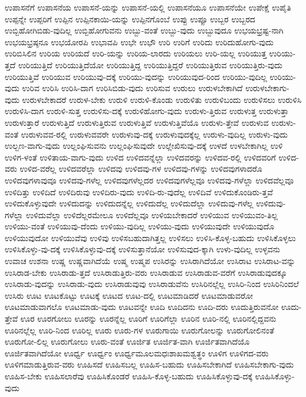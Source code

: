 {ಉಪಾಸನೆಗೆ
ಉಪಾಸನೆಯ
ಉಪಾಸನೆ-ಯನ್ನು
ಉಪಾಸನೆ-ಯಲ್ಲಿ
ಉಪಾಸನೆಯೂ
ಉಪಾಸನೆಯೇ
ಉಪೇಕ್ಷೆ
ಉಪೈತಿ
ಉಪ್ಪನ್ನೇ
ಉಪ್ಪರಿಗೆ
ಉಪ್ಪಿನ
ಉಪ್ಪಿನಕಾಯಿ-ಯನ್ನು
ಉಪ್ಪಿನಗೊಂಬೆ
ಉಪ್ಪು
ಉಪ್ಪೂ
ಉಬ್ಬರ
ಉಬ್ಬರದ
ಉಬ್ಬಿಹೋಗಿಬಿಡು-ವುದಿಲ್ಲ
ಉಬ್ಬಿಹೋಗುವನು
ಉಬ್ಬು-ವಂತೆ
ಉಬ್ಬು-ವುದು
ಉಬ್ಬುವುದೂ
ಉಭಯಭ್ರಷ್ಟ-ನಾಗಿ
ಉಭಯಭ್ರಷ್ಠನೂ
ಉಭಯೋರಪಿ
ಉಭಾವಪಿ
ಉಭೇ
ಉಭೌ
ಉರಿ
ಉರಿಗೆ
ಉರಿದು
ಉರಿದುಹೋಗು-ವುದು
ಉರಿಬಿಸಿಲಿನ
ಉರಿಯ
ಉರಿಯದೆ
ಉರಿ-ಯನ್ನು
ಉರಿಯ-ಲಾರದು
ಉರಿಯಲು
ಉರಿ-ಯಲ್ಲ
ಉರಿಯುತ್ತ
ಉರಿಯು-ತ್ತದೆ
ಉರಿಯುತ್ತಿದೆ
ಉರಿಯುತ್ತಿದೆಯೋ
ಉರಿಯುತ್ತಿದ್ದ
ಉರಿಯುತ್ತಿದ್ದರೆ
ಉರಿಯುತ್ತಿರುವ
ಉರಿಯುತ್ತಿರು-ವುದು
ಉರಿಯುತ್ತಿವೆ
ಉರಿಯುವ
ಉರಿಯುವು-ದಕ್ಕೆ
ಉರಿಯು-ವುದನ್ನು
ಉರಿಯುವುದ-ರಿಂದ
ಉರಿಯು-ವುದಿಲ್ಲ
ಉರಿಯು-ವುದು
ಉರಿವ
ಉರಿಸಿ
ಉರಿಸಿ-ದಾಗ
ಉರಿಸಿಬಿಡು-ವುದು
ಉರಿಸುವ
ಉರುಲು
ಉರುಳಬೇಕಾಗಿದೆ
ಉರುಳಬೇಕಾಗು-ವುದು
ಉರುಳಬೇಕಾದರೆ
ಉರುಳ-ಬೇಕು
ಉರುಳಿ
ಉರುಳಿ-ಕೊಂಡು
ಉರುಳಿತು
ಉರುಳಿಬಂದು
ಉರುಳಿಸಲು
ಉರುಳಿಸಿ
ಉರುಳಿಸಿ-ದಾಗ
ಉರುಳಿ-ಸುತ್ತ
ಉರುಳಿಸು-ದಕ್ಕೆ
ಉರುಳಿಹೋಗು-ವುದು
ಉರುಳು-ತ್ತಿರುವ
ಉರುಳುತ್ತ
ಉರುಳುತ್ತಾ
ಉರುಳುತ್ತಾರೆ
ಉರುಳುತ್ತಿದೆ
ಉರುಳುತ್ತಿರುವ
ಉರುಳುತ್ತಿವೆ
ಉರುಳುತ್ತಿವೆಯೊ
ಉರುಳು-ತ್ತೇವೆ
ಉರುಳುವ
ಉರುಳು-ವಂತೆ
ಉರುಳುವವ-ರಲ್ಲಿ
ಉರುಳುವವರೇ
ಉರುಳುವು-ದಕ್ಕೆ
ಉರುಳುವುದಕ್ಕೆಲ್ಲ
ಉರುಳು-ವುದಿಲ್ಲ
ಉರುಳು-ವುದು
ಉಲ್ಬಣ-ವಾಗು-ವುದು
ಉಲ್ಲಂಘಿಸುವನು
ಉಲ್ಲಂಘಿಸುವುದೇ
ಉಲ್ಲೇಖಿಸುವು-ದಕ್ಕೆ
ಉಳದೆ
ಉಳಬೇಕಾಗಿಲ್ಲ
ಉಳಿ
ಉಳಿಗ-ಳಂತೆ
ಉಳಿತಾಯ-ವಾಗು-ವುದು
ಉಳಿದ
ಉಳಿದವನ್ನೆಲ್ಲಾ
ಉಳಿದವರನ್ನು
ಉಳಿದವ-ರಲ್ಲಿ
ಉಳಿದವರಿಗೆ
ಉಳಿದ-ವರು
ಉಳಿದ-ವರೆಲ್ಲ
ಉಳಿದವರೆಲ್ಲಾ
ಉಳಿದವು
ಉಳಿದವು-ಗಳ
ಉಳಿದವು-ಗಳನ್ನು
ಉಳಿದವುಗಳಾದರೊ
ಉಳಿದವುಗಳಾವುವೂ
ಉಳಿದವು-ಗಳೆಲ್ಲ
ಉಳಿದವುಗಳೆಲ್ಲದರ
ಉಳಿದವುಗಳೆಲ್ಲವೂ
ಉಳಿದವು-ಗಳೆಲ್ಲಾ
ಉಳಿದವೆಲ್ಲವೂ
ಉಳಿದಿತ್ತು
ಉಳಿದಿದೆ
ಉಳಿದಿರುವು
ಉಳಿದಿರು-ವುದು
ಉಳಿದಿ-ರು-ವುದೆಲ್ಲ
ಉಳಿದಿವೆ
ಉಳಿದುಕೊಂಡಿರು-ತ್ತವೆ
ಉಳಿದುಕೊಳ್ಳುವುದೇ
ಉಳಿದುದನ್ನು
ಉಳಿದುದನ್ನೆಲ್ಲ
ಉಳಿದುದೆಲ್ಲ
ಉಳಿದುದೆಲ್ಲಾ
ಉಳಿದುವು-ಗಳೆಲ್ಲ
ಉಳಿದುವು-ಗಳೆಲ್ಲಾ
ಉಳಿದುವೆಲ್ಲಾ
ಉಳಿದೆಲ್ಲರಮೇಲೂ
ಉಳಿದೆಲ್ಲವೂ
ಉಳಿಯಬೇಕಾದರೆ
ಉಳಿಯುವ
ಉಳಿಯುವಂ-ತಿಲ್ಲ
ಉಳಿಯು-ವಂತೆ
ಉಳಿಯುವು-ದೆಂದು
ಉಳಿಯು-ವುದಿಲ್ಲ
ಉಳಿಯು-ವುದು
ಉಳಿಯುವುದೇ
ಉಳಿಯುವುದೊ
ಉಳಿಯುವುದೋ
ಉಳಿಯುವೆವು
ಉಳಿವು
ಉಳಿಸಬಹುದಾಗಿತ್ತಲ್ಲ
ಉಳಿಸಲು
ಉಳಿಸಿ-ಕೊಳ್ಳ-ಬಹುದು
ಉಳಿಸಿಕೊಳ್ಳಲು
ಉಳಿಸಿಕೊಳ್ಳು-ವು-ದಕ್ಕೆ
ಉಳಿಸಿಕೊಳ್ಳುವು-ದಕ್ಕೆ
ಉಳಿಸುತ್ತಾನೆಯೋ
ಉಳಿಸುವುದ-ಕ್ಕಾಗಿ
ಉಳು-ವುದಿಲ್ಲ
ಉಳ್ಳವನು
ಉವಾಚ
ಉಶನಾ
ಉಷ್ಣ
ಉಷ್ಣವಾಗಿದೆಯೆ
ಉಷ್ಮ
ಉಷ್ಮಪ
ಉಸಿರನ್ನು
ಉಸಿರಾಗಿದೆಯೋ
ಉಸಿರಾಟ
ಉಸಿರಾಟ-ವನ್ನು
ಉಸಿರಾಡ-ಬೇಕು
ಉಸಿರಾಡು-ತ್ತದೆ
ಉಸಿರಾಡುತ್ತಿರು-ವರು
ಉಸಿರಾಡುವ
ಉಸಿರಾಡುವ-ವರೆಗೆ
ಉಸಿರಾಡುವುದಕ್ಕೂ
ಉಸಿರಾಡು-ವುದನ್ನು
ಉಸಿರಾಡು-ವುದು
ಉಸಿರಾಡುವುವು
ಉಸಿರಾಡುವೆನು
ಉಸಿರಿನಲ್ಲೆಲ್ಲ
ಉಸಿರಿ-ನಿಂದ
ಉಸಿರಿನಿಂದಲೆ
ಉಸಿರು
ಊಟ
ಊಟಕೊಟ್ಟು
ಊಟಕ್ಕೆ
ಊಟದ
ಊಟ-ದಲ್ಲಿ
ಊಟಮಾಡಿದರೆ
ಊಟಮಾಡುವರೋ
ಊಟಮಾಡುವಾಗಲೊ
ಊಟಮಾಡು-ವುದು
ಊಟವನ್ನೇ
ಊದಿ
ಊದಿದನು
ಊದಿ-ದರು
ಊದುತ್ತಿರುವನೋ
ಊದು-ತ್ತೇವೆ
ಊರ
ಊರಗೋಲು
ಊರನ್ನು
ಊರನ್ನೆಲ್ಲ
ಊರಿಗೆ
ಊರಿಗೆಲ್ಲಾ
ಊರಿನ
ಊರಿ-ನಲ್ಲಿ
ಊರಿನಲ್ಲಿದ್ದವನು
ಊರಿನಲ್ಲೆಲ್ಲ
ಊರಿ-ನಿಂದ
ಊರಿಲ್ಲ
ಊರು
ಊರು-ಗಳ
ಊರುಗಾಯಿ
ಊರುಗೋಲನ್ನು
ಊರುಗೋಲಿನಂತೆ
ಊರುಗೋ-ಲಿಲ್ಲ
ಊರುಗೋಲು
ಊರು-ವಂತೆ
ಊರ್ಜಿತ
ಊರ್ಜಿತ-ವಾಗಿ
ಊರ್ಜಿತವಾಗಿದೆಯೊ
ಊರ್ಜಿತವಾಗಿದೆಯೋ
ಊರ್ಧ್ವ
ಊರ್ಧ್ವಂ
ಊರ್ಧ್ವಮೂಲಮಧಃಶಾಖಮಶ್ವತ್ಥಂ
ಊಳಿಗ
ಊಳಿಗದ-ವರು
ಊಳಿಗಮಾಡುತ್ತಿರುವ-ವರು
ಊಹಿಸದೆ
ಊಹಿಸಬಲ್ಲ
ಊಹಿಸ-ಬಹುದು
ಊಹಿಸಬೇಕಾಗಿದೆ
ಊಹಿಸಬೇಕಾಗು-ವುದು
ಊಹಿಸ-ಬೇಕು
ಊಹಿಸಲಾರೆವು
ಊಹಿಸಿಕೊಂಡರೆ
ಊಹಿಸಿ-ಕೊಳ್ಳ-ಬಹುದು
ಊಹಿಸಿಕೊಳ್ಳುವು-ದಕ್ಕೆ
ಊಹಿಸಿಕೊಳ್ಳು-ವುದು
}
